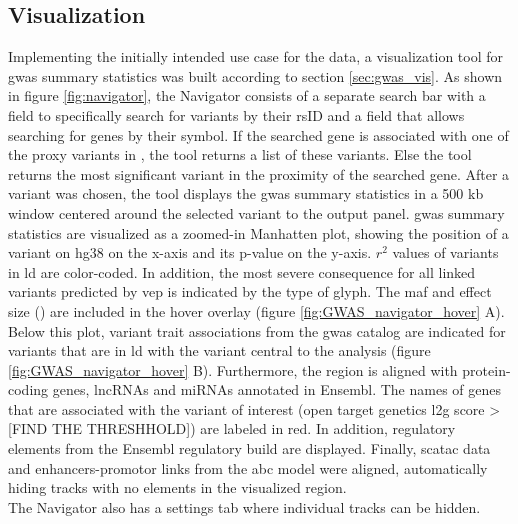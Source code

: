     \subsection{Visualization}
    \label{subsec:result_vis}
    Implementing the initially intended use case for the data, a visualization tool for \ac{gwas} summary statistics was built according to section \ref{sec:gwas_vis}. As shown in figure \ref{fig:navigator}, the  Navigator consists of a separate search bar with a field to specifically search for variants by their rsID and a field that allows searching for genes by their symbol. If the searched gene is associated with one of the proxy variants in \textcite{aragamDiscoverySystematicCharacterization2021}, the tool returns a list of these variants. Else the tool returns the most significant variant in the proximity of the searched gene. After a variant was chosen, the tool displays the \ac{gwas} summary statistics in a 500 kb window centered around the selected variant to the output panel. \ac{gwas} summary statistics are visualized as a zoomed-in Manhatten plot, showing the position of a variant on \ac{hg38} on the x-axis and its p-value on the y-axis. $r^2$ values of variants in \ac{ld} are color-coded. In addition, the most severe consequence for all linked variants predicted by \ac{vep} is indicated by the type of glyph. The \ac{maf} and effect size (\beta) are included in the hover overlay (figure \ref{fig:GWAS_navigator_hover} A). Below this plot, variant trait associations from the \ac{gwas} catalog are indicated for variants that are in \ac{ld} with the variant central to the analysis (figure \ref{fig:GWAS_navigator_hover} B). Furthermore, the region is aligned with protein-coding genes, \acp{lncRNA} and \acp{miRNA} annotated in Ensembl. The names of genes that are associated with the variant of interest (open target genetics \ac{l2g} score > [FIND THE THRESHHOLD]) are labeled in red. In addition, regulatory elements from the Ensembl regulatory build are displayed. Finally, sc\ac{atac} data and enhancers-promotor links from the \ac{abc} model were aligned, automatically hiding tracks with no elements in the visualized region.\\
    The  Navigator also has a settings tab where individual tracks can be hidden.

